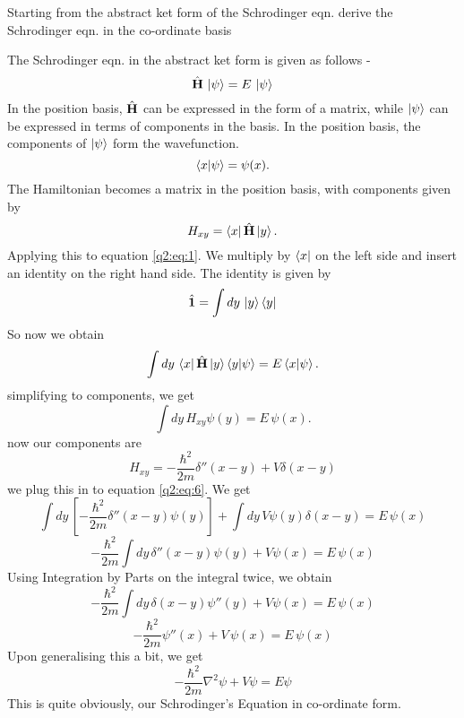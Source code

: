 Starting from the abstract ket form of the Schrodinger eqn. derive the Schrodinger eqn. in the co-ordinate basis

The Schrodinger eqn. in the abstract ket form is given as follows -
    \begin{equation} \label{q2:eq:1}
        \hat{\textbf{H}} \, \ket{\psi} = E\, \ket{\psi}
    \end{equation}
In the position basis, $\hat{\textbf{H}}$ can be expressed in the form of a matrix, while $\ket{\psi}$ can be expressed in terms of components in the basis.
In the position basis, the components of $\ket{\psi}$ form the wavefunction.
    \begin{equation}
        \braket{x}{\psi} = \psi(x).
    \end{equation}
The Hamiltonian becomes a matrix in the position basis, with components given by 
    \begin{equation}
        H_{xy} = \bra{x}\hat{\textbf{H}}\ket{y}.
    \end{equation}
Applying this to equation \ref{q2:eq:1}. We multiply by $\bra{x}$ on the left side and insert an identity on the right hand side.
The identity is given by 
    \begin{equation}
        \hat{\textbf{1}} = \int dy\, \ket{y}\bra{y}
    \end{equation}
So now we obtain 
    \begin{equation}
        \int dy\, \bra{x}\hat{\textbf{H}}\ket{y}\braket{y}{\psi} = E \braket{x}{\psi}.
    \end{equation}
simplifying to components, we get 
    \begin{equation} \label{q2:eq:6}
        \int dy \, H_{xy} \psi(y) = E \, \psi(x).
    \end{equation}
now our components are 
    \begin{equation}
        H_{xy} = -\frac{\hbar^2}{2m}\delta''(x-y) + V\delta(x-y)
    \end{equation}
we plug this in to equation \ref{q2:eq:6}. We get  
    \begin{equation}
        \int dy \, [-\frac{\hbar^2}{2m}\delta''(x-y) \psi(y)] + \int dy \, V\psi(y)\delta(x-y) = E \, \psi(x)
    \end{equation}
    \begin{equation}
        - \frac{\hbar^2}{2m} \int dy \, \delta''(x-y) \psi(y) + V \psi(x) = E\,  \psi(x)        
    \end{equation}
Using Integration by Parts on the integral twice, we obtain 
    \begin{equation}
        - \frac{\hbar^2}{2m} \int dy \, \delta(x-y) \psi''(y) + V \psi(x) = E\,  \psi(x)        
    \end{equation}
    \begin{equation}
        - \frac{\hbar^2}{2m} \psi''(x) + V\, \psi(x) = E\,  \psi(x)        
    \end{equation}
Upon generalising this a bit, we get
    \begin{equation}
        - \frac{\hbar^2}{2m} \nabla^2 \psi + V \psi = E \psi        
    \end{equation}
This is quite obviously, our Schrodinger's Equation in co-ordinate form.
